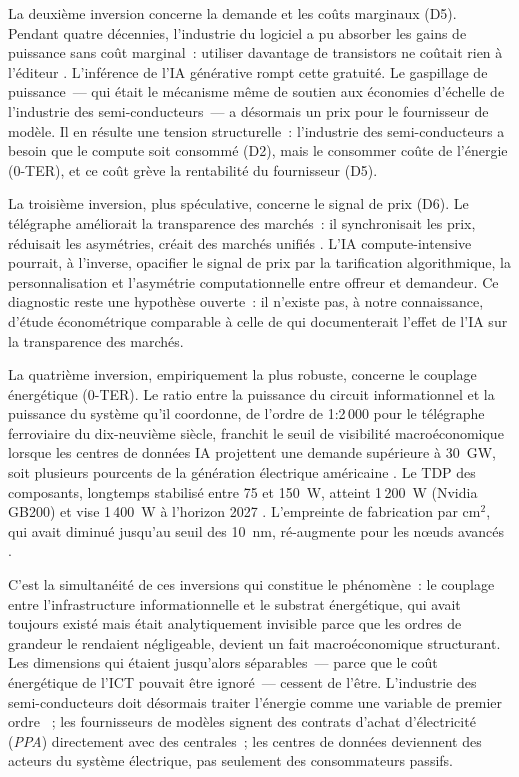 La deuxième inversion concerne la demande et les coûts marginaux (D5). Pendant quatre décennies, l'industrie du logiciel a pu absorber les gains de puissance sans coût marginal~: utiliser davantage de transistors ne coûtait rien à l'éditeur \parencite{gilder_coming_1995, schaller_origin_1996}. L'inférence de l'IA générative rompt cette gratuité. Le gaspillage de puissance~--- qui était le mécanisme même de soutien aux économies d'échelle de l'industrie des semi-conducteurs~--- a désormais un prix pour le fournisseur de modèle. Il en résulte une tension structurelle~: l'industrie des semi-conducteurs a besoin que le compute soit consommé (D2), mais le consommer coûte de l'énergie (0-TER), et ce coût grève la rentabilité du fournisseur (D5).

La troisième inversion, plus spéculative, concerne le signal de prix (D6). Le télégraphe améliorait la transparence des marchés~: il synchronisait les prix, réduisait les asymétries, créait des marchés unifiés \parencite{steinwender_real_2018}. L'IA compute-intensive pourrait, à l'inverse, opacifier le signal de prix par la tarification algorithmique, la personnalisation et l'asymétrie computationnelle entre offreur et demandeur. Ce diagnostic reste une hypothèse ouverte~: il n'existe pas, à notre connaissance, d'étude économétrique comparable à celle de \textcite{steinwender_real_2018} qui documenterait l'effet de l'IA sur la transparence des marchés.

La quatrième inversion, empiriquement la plus robuste, concerne le couplage énergétique (0-TER). Le ratio entre la puissance du circuit informationnel et la puissance du système qu'il coordonne, de l'ordre de 1:2\,000 pour le télégraphe ferroviaire du dix-neuvième siècle, franchit le seuil de visibilité macroéconomique lorsque les centres de données IA projettent une demande supérieure à 30~GW, soit plusieurs pourcents de la génération électrique américaine \parencite{epoch_electricity_2025, iea_data_2024}. Le TDP des composants, longtemps stabilisé entre 75 et 150~W, atteint 1\,200~W (Nvidia GB200) et vise 1\,400~W à l'horizon 2027 \parencite{sun_chip_2024}. L'empreinte de fabrication par cm$^2$, qui avait diminué jusqu'au seuil des 10~nm, ré-augmente pour les nœuds avancés \parencite{pirson_environmental_2022}.

C'est la simultanéité de ces inversions qui constitue le phénomène~: le couplage entre l'infrastructure informationnelle et le substrat énergétique, qui avait toujours existé mais était analytiquement invisible parce que les ordres de grandeur le rendaient négligeable, devient un fait macroéconomique structurant. Les dimensions qui étaient jusqu'alors séparables~--- parce que le coût énergétique de l'ICT pouvait être ignoré~--- cessent de l'être. L'industrie des semi-conducteurs doit désormais traiter l'énergie comme une variable de premier ordre \parencite{epoch_electricity_2025}~; les fournisseurs de modèles signent des contrats d'achat d'électricité (\emph{PPA}) directement avec des centrales~; les centres de données deviennent des acteurs du système électrique, pas seulement des consommateurs passifs.

